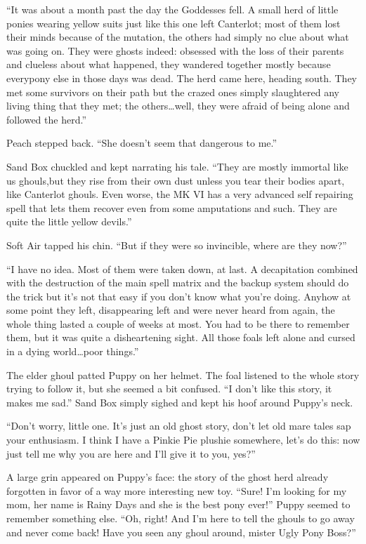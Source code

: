 ``It was about a month past the day the Goddesses fell. A small herd of little ponies wearing yellow suits just like this one left Canterlot; most of them lost their minds because of the mutation, the others had simply no clue about what was going on. They were ghosts indeed: obsessed with the loss of their parents and clueless about what happened, they wandered together mostly because everypony else in those days was dead. The herd came here, heading south. They met some survivors on their path but the crazed ones simply slaughtered any living thing that they met; the others\dots well, they were afraid of being alone and followed the herd.''

Peach stepped back. ``She doesn't seem that dangerous to me.''

Sand Box chuckled and kept narrating his tale. ``They are mostly immortal like us ghouls,but they rise from their own dust unless you tear their bodies apart, like Canterlot ghouls. Even worse, the MK VI has a very advanced self repairing spell that lets them recover even from some amputations and such. They are quite the little yellow devils.''

Soft Air tapped his chin. ``But if they were so invincible, where are they now?''

``I have no idea. Most of them were taken down, at last. A decapitation combined with the destruction of the main spell matrix and the backup system should do the trick but it's not that easy if you don't know what you're doing. Anyhow at some point they left, disappearing left and were never heard from again, the whole thing lasted a couple of weeks at most. You had to be there to remember them, but it was quite a disheartening sight. All those foals left alone and cursed in a dying world\dots poor things.''

The elder ghoul patted Puppy on her helmet. The foal listened to the whole story trying to follow it, but she seemed a bit confused. ``I don't like this story, it makes me sad.'' Sand Box simply sighed and kept his hoof around Puppy's neck.

``Don't worry, little one. It's just an old ghost story, don't let old mare tales sap your enthusiasm. I think I have a Pinkie Pie plushie somewhere, let's do this: now just tell me why you are here and I'll give it to you, yes?''

A large grin appeared on Puppy's face: the story of the ghost herd already forgotten in favor of a way more interesting new toy. ``Sure! I'm looking for my mom, her name is Rainy Days and she is the best pony ever!'' Puppy seemed to remember something else. ``Oh, right! And I'm here to tell the ghouls to go away and never come back! Have you seen any ghoul around, mister Ugly Pony Boss?''


